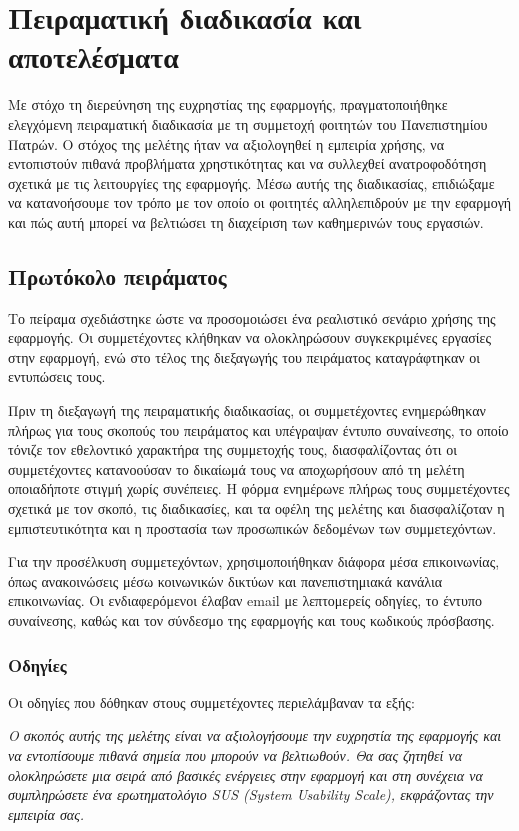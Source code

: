 \chapter{Πειραματική διαδικασία και αποτελέσματα}
    Με στόχο τη διερεύνηση της ευχρηστίας της εφαρμογής, πραγματοποιήθηκε ελεγχόμενη πειραματική διαδικασία με τη συμμετοχή φοιτητών του Πανεπιστημίου Πατρών. Ο στόχος της μελέτης ήταν να αξιολογηθεί η εμπειρία χρήσης, να εντοπιστούν πιθανά προβλήματα χρηστικότητας και να συλλεχθεί ανατροφοδότηση σχετικά με τις λειτουργίες της εφαρμογής. Μέσω αυτής της διαδικασίας, επιδιώξαμε να κατανοήσουμε τον τρόπο με τον οποίο οι φοιτητές αλληλεπιδρούν με την εφαρμογή και πώς αυτή μπορεί να βελτιώσει τη διαχείριση των καθημερινών τους εργασιών.

    \section{Πρωτόκολο πειράματος}
        Το πείραμα σχεδιάστηκε ώστε να προσομοιώσει ένα ρεαλιστικό σενάριο χρήσης της εφαρμογής. Οι συμμετέχοντες κλήθηκαν να ολοκληρώσουν συγκεκριμένες εργασίες στην εφαρμογή, ενώ στο τέλος της διεξαγωγής του πειράματος καταγράφτηκαν οι εντυπώσεις τους.

        Πριν τη διεξαγωγή της πειραματικής διαδικασίας, οι συμμετέχοντες ενημερώθηκαν πλήρως για τους σκοπούς του πειράματος και υπέγραψαν έντυπο συναίνεσης, το οποίο τόνιζε τον εθελοντικό χαρακτήρα της συμμετοχής τους, διασφαλίζοντας ότι οι συμμετέχοντες κατανοούσαν το δικαίωμά τους να αποχωρήσουν από τη μελέτη οποιαδήποτε στιγμή χωρίς συνέπειες. Η φόρμα ενημέρωνε πλήρως τους συμμετέχοντες σχετικά με τον σκοπό, τις διαδικασίες, και τα οφέλη της μελέτης και διασφαλίζοταν η εμπιστευτικότητα και η προστασία των προσωπικών δεδομένων των συμμετεχόντων.

        Για την προσέλκυση συμμετεχόντων, χρησιμοποιήθηκαν διάφορα μέσα επικοινωνίας, όπως ανακοινώσεις μέσω κοινωνικών δικτύων και πανεπιστημιακά κανάλια επικοινωνίας. Οι ενδιαφερόμενοι έλαβαν email με λεπτομερείς οδηγίες, το έντυπο συναίνεσης, καθώς και τον σύνδεσμο της εφαρμογής και τους κωδικούς πρόσβασης.

        \subsection{Οδηγίες}
            Οι οδηγίες που δόθηκαν στους συμμετέχοντες περιελάμβαναν τα εξής:

            \textit{Ο σκοπός αυτής της μελέτης είναι να αξιολογήσουμε την ευχρηστία της εφαρμογής και να εντοπίσουμε πιθανά σημεία που μπορούν να βελτιωθούν. Θα σας ζητηθεί να ολοκληρώσετε μια σειρά από βασικές ενέργειες στην εφαρμογή και στη συνέχεια να συμπληρώσετε ένα ερωτηματολόγιο SUS (System Usability Scale), εκφράζοντας την εμπειρία σας.}

